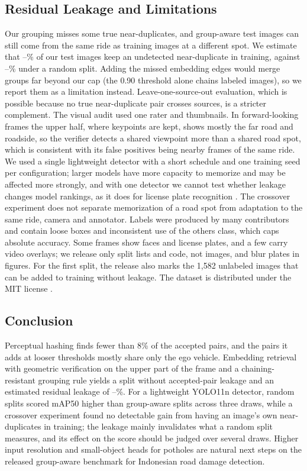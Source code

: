 \documentclass[conference,a4paper]{IEEEtran}
\begin{document}
\subsection{Residual Leakage and Limitations}
Our grouping misses some true near-duplicates, and group-aware test images can still come from the same ride as training images at a different spot. We estimate that \ResidLo--\ResidHi\% of our test images keep an undetected near-duplicate in training, against \LeakRandStrong--\LeakRand\% under a random split. Adding the missed embedding edges would merge groups far beyond our cap (the 0.90 threshold alone chains \LargestCosNinety{} labeled images), so we report them as a limitation instead. Leave-one-source-out evaluation, which is possible because no true near-duplicate pair crosses sources, is a stricter complement. The visual audit used one rater and thumbnails. In forward-looking frames the upper half, where keypoints are kept, shows mostly the far road and roadside, so the verifier detects a shared viewpoint more than a shared road spot, which is consistent with its false positives being nearby frames of the same ride. We used a single lightweight detector with a short schedule and one training seed per configuration; larger models have more capacity to memorize and may be affected more strongly, and with one detector we cannot test whether leakage changes model rankings, as it does for license plate recognition \cite{laroca2023duplicates}. The crossover experiment does not separate memorization of a road spot from adaptation to the same ride, camera and annotator. Labels were produced by many contributors and contain loose boxes and inconsistent use of the others class, which caps absolute accuracy. Some frames show faces and license plates, and a few carry video overlays; we release only split lists and code, not images, and blur plates in figures. For the first split, the release also marks the 1,582 unlabeled images that can be added to training without leakage. The dataset is distributed under the MIT license \cite{rddc2024id}.

\subsection{Conclusion}
Perceptual hashing finds fewer than 8\% of the accepted pairs, and the pairs it adds at looser thresholds mostly share only the ego vehicle. Embedding retrieval with geometric verification on the upper part of the frame and a chaining-resistant grouping rule yields a split without accepted-pair leakage and an estimated residual leakage of \ResidLo--\ResidHi\%. For a lightweight YOLO11n detector, random splits scored \InflFifty{} mAP50 higher than group-aware splits across three draws, while a crossover experiment found no detectable gain from having an image's own near-duplicates in training; the leakage mainly invalidates what a random split measures, and its effect on the score should be judged over several draws. Higher input resolution and small-object heads for potholes are natural next steps on the released group-aware benchmark for Indonesian road damage detection.
\end{document}
